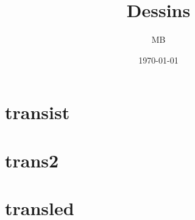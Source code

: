 

\title{
Dessins
}


\author{MB}

\date{\today}


\maketitle

\section{transist}
\fbox{}

\section{trans2}
\fbox{}

\section{transled}
\fbox{}
 





